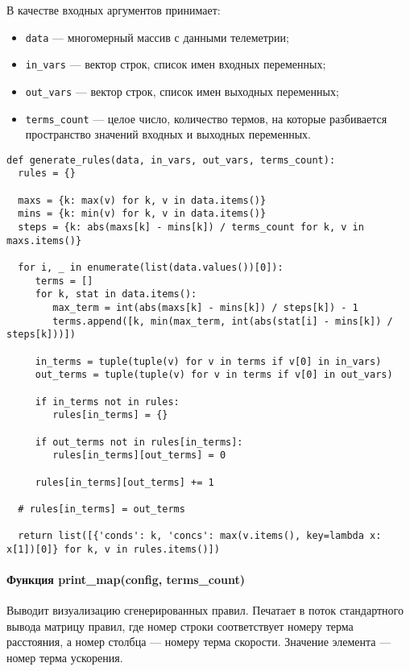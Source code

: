 В качестве входных аргументов принимает:
\begin{itemize}
	\item \lstinline!data! — многомерный массив с данными телеметрии;
	\item \lstinline!in_vars! — вектор строк, список имен входных переменных;
	\item \lstinline!out_vars! — вектор строк, список имен выходных переменных;
	\item \lstinline!terms_count! — целое число, количество термов, на которые разбивается пространство значений входных и выходных переменных.
\end{itemize}

\begin{lstlisting}[style=pythonstyle,caption={  }, label=lst:func:1]
def generate_rules(data, in_vars, out_vars, terms_count):
  rules = {}

  maxs = {k: max(v) for k, v in data.items()}
  mins = {k: min(v) for k, v in data.items()}
  steps = {k: abs(maxs[k] - mins[k]) / terms_count for k, v in maxs.items()}

  for i, _ in enumerate(list(data.values())[0]):
     terms = []
     for k, stat in data.items():
        max_term = int(abs(maxs[k] - mins[k]) / steps[k]) - 1
        terms.append([k, min(max_term, int(abs(stat[i] - mins[k]) / steps[k]))])

     in_terms = tuple(tuple(v) for v in terms if v[0] in in_vars)
     out_terms = tuple(tuple(v) for v in terms if v[0] in out_vars)

     if in_terms not in rules:
        rules[in_terms] = {}

     if out_terms not in rules[in_terms]:
        rules[in_terms][out_terms] = 0

     rules[in_terms][out_terms] += 1

  # rules[in_terms] = out_terms

  return list([{'conds': k, 'concs': max(v.items(), key=lambda x: x[1])[0]} for k, v in rules.items()])
\end{lstlisting}

\paragraph{Функция print\_map(config, terms\_count)}

Выводит визуализацию сгенерированных правил. Печатает в поток стандартного вывода матрицу правил, где номер строки соответствует номеру терма расстояния, а номер столбца — номеру терма скорости. Значение элемента — номер терма ускорения.

